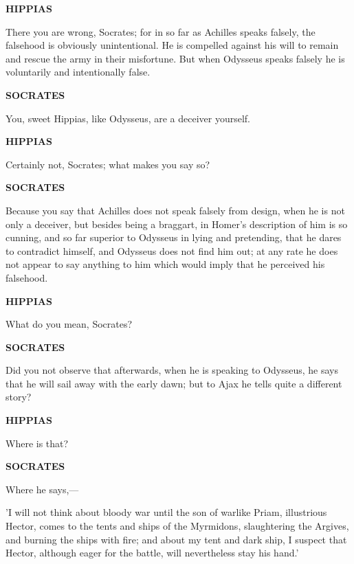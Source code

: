 \documentclass[11pt,letter]{article}
\begin{document}
\par \textbf{HIPPIAS}
\par   There you are wrong, Socrates; for in so far as Achilles speaks falsely, the falsehood is obviously unintentional. He is compelled against his will to remain and rescue the army in their misfortune. But when Odysseus speaks falsely he is voluntarily and intentionally false.

\par \textbf{SOCRATES}
\par   You, sweet Hippias, like Odysseus, are a deceiver yourself.

\par \textbf{HIPPIAS}
\par   Certainly not, Socrates; what makes you say so?

\par \textbf{SOCRATES}
\par   Because you say that Achilles does not speak falsely from design, when he is not only a deceiver, but besides being a braggart, in Homer's description of him is so cunning, and so far superior to Odysseus in lying and pretending, that he dares to contradict himself, and Odysseus does not find him out; at any rate he does not appear to say anything to him which would imply that he perceived his falsehood.

\par \textbf{HIPPIAS}
\par   What do you mean, Socrates?

\par \textbf{SOCRATES}
\par   Did you not observe that afterwards, when he is speaking to Odysseus, he says that he will sail away with the early dawn; but to Ajax he tells quite a different story?

\par \textbf{HIPPIAS}
\par   Where is that?

\par \textbf{SOCRATES}
\par   Where he says,—

\par  'I will not think about bloody war until the son of warlike Priam, illustrious Hector, comes to the tents and ships of the Myrmidons, slaughtering the Argives, and burning the ships with fire; and about my tent and dark ship, I suspect that Hector, although eager for the battle, will nevertheless stay his hand.'
\end{document}
